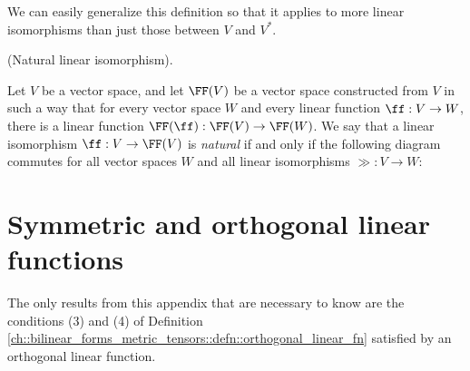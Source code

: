 We can easily generalize this definition so that it applies to more linear isomorphisms than just those between $V$ and $V^*$.

\begin{defn}
	(Natural linear isomorphism).
	
	Let $V$ be a vector space, and let $\FF(V)$ be a vector space constructed from $V$ in such a way that for every vector space $W$ and every linear function $\ff:V \rightarrow W$, there is a linear function $\FF(\ff):\FF(V) \rightarrow \FF(W)$. We say that a linear isomorphism $\ff:V \rightarrow \FF(V)$ is \textit{natural} if and only if the following diagram commutes for all vector spaces $W$ and all linear isomorphisms $\gg:V \rightarrow W$:
	
	\begin{center}
	\end{center}
\end{defn}

\section*{Symmetric and orthogonal linear functions}

The only results from this appendix that are necessary to know are the conditions (3) and (4) of Definition \ref{ch::bilinear_forms_metric_tensors::defn::orthogonal_linear_fn} satisfied by an orthogonal linear function.

